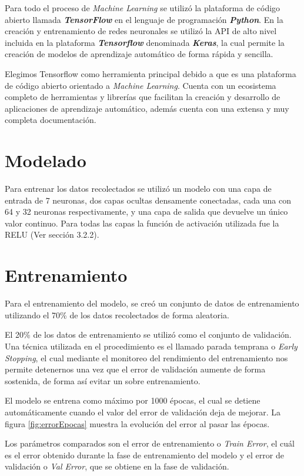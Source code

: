 Para todo el proceso de \textit{Machine Learning} se utilizó la plataforma de código abierto llamada \textit{\textbf{TensorFlow}} \cite{tensowFlow} en el lenguaje de programación \textit{\textbf{Python}}. En la creación y entrenamiento de redes neuronales se utilizó la API de alto nivel incluida en la plataforma \textit{\textbf{Tensorflow}} denominada \textit{\textbf{Keras}}, la cual permite la creación de modelos de aprendizaje automático de forma rápida y sencilla.

Elegimos Tensorflow como herramienta principal debido a que es una plataforma de código abierto orientado a \textit{Machine Learning}. Cuenta con un ecosistema completo de herramientas y librerías que facilitan la creación y desarrollo de aplicaciones de aprendizaje automático, además cuenta con una extensa y muy completa documentación.

\section{Modelado}

Para entrenar los datos recolectados se utilizó un modelo con una capa de entrada de 7 neuronas, dos capas ocultas densamente conectadas, cada una con 64 y 32 neuronas respectivamente, y una capa de salida que devuelve un único valor continuo.
Para todas las capas la función de activación utilizada fue la RELU (Ver sección 3.2.2).

\section{Entrenamiento}
Para el entrenamiento del modelo, se creó un conjunto de datos de entrenamiento utilizando el 70\% de los datos recolectados de forma aleatoria.  

El 20\% de los datos de entrenamiento se utilizó como el conjunto de validación. Una técnica utilizada en el procedimiento es el  llamado parada temprana o \textit{Early Stopping}, el cual mediante el monitoreo del rendimiento del entrenamiento nos permite detenernos una vez que el error de validación aumente de forma sostenida, de forma así evitar un sobre entrenamiento.

El modelo se entrena como máximo por 1000 épocas, el cual se detiene automáticamente cuando el valor del error de validación deja de mejorar. La figura \ref{fig:errorEpocas} muestra la evolución del error al pasar las épocas.

Los parámetros comparados son el error de entrenamiento o \textit{Train Error}, el cuál es el error obtenido durante la fase de entrenamiento del modelo y el error de validación o \textit{Val Error}, que se obtiene en la fase de validación.

